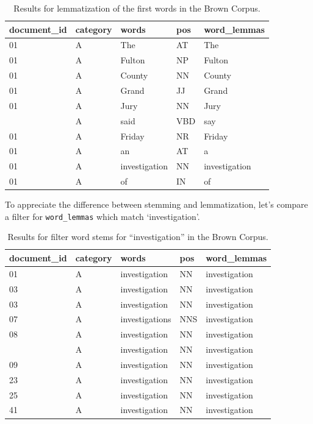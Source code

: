 \documentclass[
  letterpaper,
]{scrbook}
\begin{document}
\hypertarget{tbl-recoding-lemmatization-brown-example}{}
\begin{table}
\caption{\label{tbl-recoding-lemmatization-brown-example}Results for lemmatization of the first words in the Brown Corpus. }\tabularnewline

\centering
\begin{tabular}{lllll}
\toprule
document\_id & category & words & pos & word\_lemmas\\
\midrule
01 & A & The & AT & The\\
01 & A & Fulton & NP & Fulton\\
01 & A & County & NN & County\\
01 & A & Grand & JJ & Grand\\
01 & A & Jury & NN & Jury\\
\addlinespace
01 & A & said & VBD & say\\
01 & A & Friday & NR & Friday\\
01 & A & an & AT & a\\
01 & A & investigation & NN & investigation\\
01 & A & of & IN & of\\
\bottomrule
\end{tabular}
\end{table}

To appreciate the difference between stemming and lemmatization, let's
compare a filter for \texttt{word\_lemmas} which match `investigation'.

\hypertarget{tbl-recoding-lemmatization-brown-investigation}{}
\begin{table}
\caption{\label{tbl-recoding-lemmatization-brown-investigation}Results for filter word stems for ``investigation'' in the Brown Corpus. }\tabularnewline

\centering
\begin{tabular}{lllll}
\toprule
document\_id & category & words & pos & word\_lemmas\\
\midrule
01 & A & investigation & NN & investigation\\
03 & A & investigation & NN & investigation\\
03 & A & investigation & NN & investigation\\
07 & A & investigations & NNS & investigation\\
08 & A & investigation & NN & investigation\\
\addlinespace
09 & A & investigation & NN & investigation\\
09 & A & investigation & NN & investigation\\
23 & A & investigation & NN & investigation\\
25 & A & investigation & NN & investigation\\
41 & A & investigation & NN & investigation\\
\bottomrule
\end{tabular}
\end{table}
\end{document}
